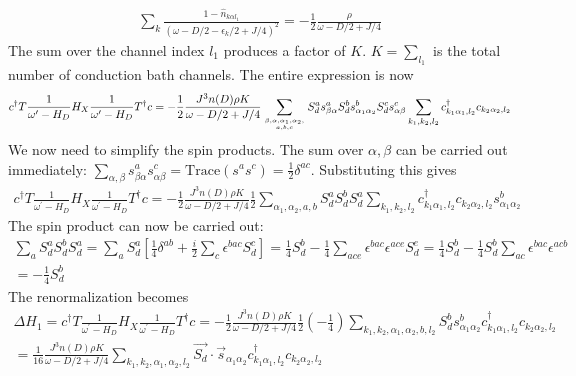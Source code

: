 \documentclass{revtex4-2}
\begin{document}
\begin{align}
	\sum_k \frac{1 - \hat n_{k\alpha l_1}}{\left(\omega - D/2 -\epsilon_k/2 + J/4\right)^2} = -\frac{1}{2}\frac{\rho}{\omega - D/2 + J/4}
\end{align}
The sum over the channel index \(l_1\) produces a factor of \(K\). \(K = \sum_{l_1}\) is the total number of conduction bath channels. The entire expression is now
\begin{align}
	\label{first_term}
	c^\dagger T \frac{1}{\omega^\prime - H_D} H_X \frac{1}{\omega^\prime - H_D} T^\dagger c = -\frac{1}{2}\frac{J^3 n(D) \rho K}{\omega - D/2 + J/4}\sum_{\beta, \alpha, \alpha_1,\alpha_2,\atop{a,b,c}} S_d^a s^a_{\beta \alpha} S_d^b s^b_{\alpha_1 \alpha_2} S_d^c s^c_{\alpha \beta} \sum_{k_1,k_2,l_2} c^\dagger_{k_1\alpha_1,l_2}c_{k_2 \alpha_2,l_2}
\end{align}
We now need to simplify the spin products. The sum over \(\alpha,\beta\) can be carried out immediately: \(\sum_{\alpha,\beta} s^a_{\beta \alpha} s^c_{\alpha \beta} = \text{Trace}\left(s^a s^c\right) = \frac{1}{2}\delta^{ac}\). Substituting this gives
\begin{align}
	c^\dagger T \frac{1}{\omega^\prime - H_D} H_X \frac{1}{\omega^\prime - H_D} T^\dagger c = -\frac{1}{2}\frac{J^3 n(D) \rho K}{\omega - D/2 + J/4}\frac{1}{2}\sum_{\alpha_1,\alpha_2,a,b} S_d^a S_d^b S_d^a \sum_{k_1,k_2,l_2} c^\dagger_{k_1\alpha_1,l_2}c_{k_2 \alpha_2,l_2}s^b_{\alpha_1 \alpha_2} 
\end{align}
The spin product can now be carried out:
\begin{align}
	\sum_a S_d^a S_d^b S_d^a = \sum_a S_d^a\left[\frac{1}{4}\delta^{ab} + \frac{i}{2}\sum_c \epsilon^{bac}S_d^c\right] = \frac{1}{4}S_d^b - \frac{1}{4}\sum_{ace}\epsilon^{bac}\epsilon^{ace}S_d^e = \frac{1}{4}S_d^b - \frac{1}{4}S_d^b \sum_{ac}\epsilon^{bac}\epsilon^{acb} \\
	= -\frac{1}{4}S_d^b
\end{align}
The renormalization becomes
\begin{align}
	\Delta H_1 = c^\dagger T \frac{1}{\omega^\prime - H_D} H_X \frac{1}{\omega^\prime - H_D} T^\dagger c = -\frac{1}{2}\frac{J^3 n(D) \rho K}{\omega - D/2 + J/4}\frac{1}{2}\left( -\frac{1}{4} \right) \sum_{k_1,k_2,\alpha_1,\alpha_2,b,l_2} S_d^b s^b_{\alpha_1 \alpha_2} c^\dagger_{k_1\alpha_1,l_2}c_{k_2 \alpha_2,l_2}\\
=\frac{1}{16}\frac{J^3 n(D) \rho K}{\omega - D/2 + J/4} \sum_{k_1,k_2,\alpha_1,\alpha_2,l_2} \vec{S_d}\cdot\vec{s}_{\alpha_1 \alpha_2} c^\dagger_{k_1\alpha_1,l_2}c_{k_2 \alpha_2,l_2}
\end{align}
\end{document}
